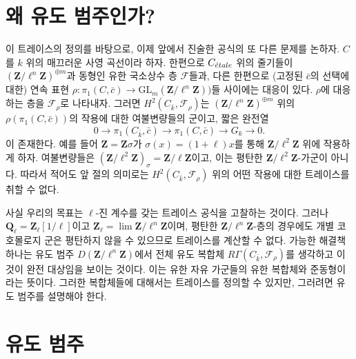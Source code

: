 \section{왜 유도 범주인가?}
\label{section-derived-categories-why}

\noindent
이 트레이스의 정의를 바탕으로, 이제 앞에서 진술한 공식의 또 다른
문제를 논하자. $C$를 $k$ 위의 매끄러운 사영 곡선이라 하자. 한편으로
$C_{\acute{e}tale}$ 위의 줄기들이
${(\mathbf{Z}/\ell^n\mathbf{Z})}^{\oplus m}$과 동형인 유한 국소상수 층
$\mathcal{F}$들과, 다른 한편으로 (고정된 $\bar c$의 선택에 대한) 연속 표현
$\rho : \pi_1 (C, \bar c) \to
\text{GL}_m(\mathbf{Z}/\ell^n\mathbf{Z}))$들 사이에는 대응이 있다.
$\rho$에 대응하는 층을 $\mathcal{F}_\rho$로 나타내자. 그러면
$H^2 (C_{\bar k}, \mathcal{F}_\rho)$는
${(\mathbf{Z}/\ell^n\mathbf{Z})}^{\oplus m}$ 위의
$\rho(\pi_1 (C, \bar c))$의 작용에 대한 여불변량들의 군이고, 짧은 완전열
$$
0 \longrightarrow \pi_1 (C_{\bar k}, \bar c) \longrightarrow \pi_1 (C, \bar c)
\longrightarrow G_k \longrightarrow 0.
$$
이 존재한다. 예를 들어 $\mathbf{Z} = \mathbf{Z} \sigma$가
$\sigma(x) = (1+\ell) x$를 통해 $\mathbf{Z}/\ell^2\mathbf{Z}$ 위에
작용하게 하자. 여불변량들은
$(\mathbf{Z}/\ell^2\mathbf{Z})_{\sigma} = \mathbf{Z}/\ell\mathbf{Z}$이고,
이는 평탄한 $\mathbf{Z}/\ell^2\mathbf{Z}$-가군이 아니다. 따라서 적어도
앞 절의 의미로는 $H^2(C_{\bar k}, \mathcal{F}_\rho)$ 위의 어떤 작용에
대한 트레이스를 취할 수 없다.

\medskip\noindent
사실 우리의 목표는 $\ell$-진 계수를 갖는 트레이스 공식을 고찰하는
것이다. 그러나 $\mathbf{Q}_\ell = \mathbf{Z}_\ell[1/\ell]$이고
$\mathbf{Z}_\ell = \lim \mathbf{Z}/\ell^n\mathbf{Z}$이며, 평탄한
$\mathbf{Z}/\ell^n\mathbf{Z}$-층의 경우에도 개별 코호몰로지 군은
평탄하지 않을 수 있으므로 트레이스를 계산할 수 없다. 가능한 해결책
하나는 유도 범주 $D(\mathbf{Z}/\ell^n\mathbf{Z})$에서 전체 유도 복합체
$R\Gamma(C_{\bar k}, \mathcal{F}_\rho)$를 생각하고 이것이 완전 대상임을
보이는 것이다. 이는 유한 자유 가군들의 유한 복합체와 준동형이라는
뜻이다. 그러한 복합체들에 대해서는 트레이스를 정의할 수 있지만,
그러려면 유도 범주를 설명해야 한다.






\section{유도 범주}
\label{section-derived-categories}

